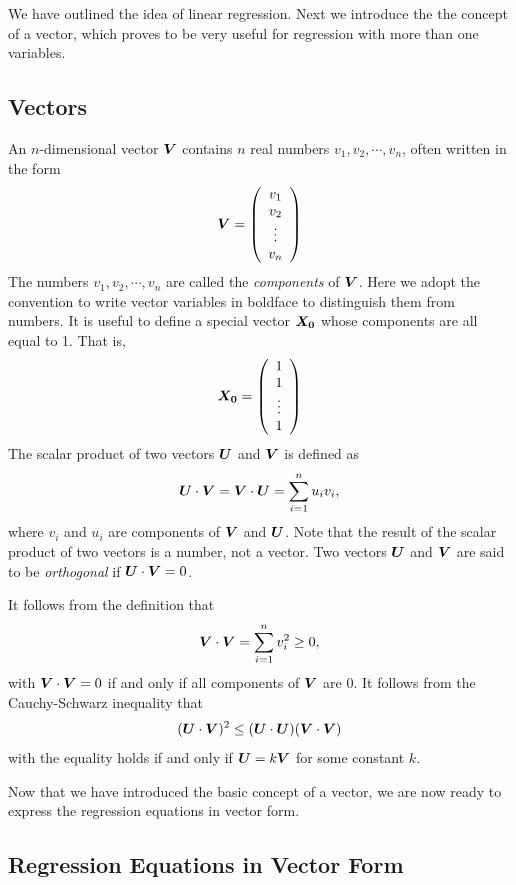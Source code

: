 \documentclass[11pt]{article}
\newcommand{\beq}{\begin{equation}}
\newcommand{\eeq}{\end{equation}}
\newcommand{\ve}[1]{\mbox{\boldmath $#1$}}
\begin{document}
We have outlined the idea of linear regression. Next we introduce the 
the concept of a vector, which proves to be very useful for regression 
with more than one variables.

\subsection{Vectors}

An $n$-dimensional vector $\ve{V}$ contains $n$ real numbers $v_1,v_2,\cdots,v_n$, often 
written in the form 
\[
  \ve{V} = \left( \begin{array}{c} v_1 \\ v_2 \\ \vdots \\ v_n \end{array} \right) 
\]
The numbers $v_1,v_2,\cdots,v_n$ are called the {\it components} of $\ve{V}$. 
Here we adopt the convention to write vector variables in boldface to distinguish 
them from numbers. It is useful to define a special vector $\ve{X_0}$ whose 
components are all equal to 1. That is, 
\beq
  \ve{X_0} = \left( \begin{array}{c} 1 \\ 1 \\ \vdots \\ 1 \end{array} \right)
\eeq
The scalar product of two vectors $\ve{U}$ and $\ve{V}$ is defined as 
\[
  \ve{U}\cdot \ve{V} = \ve{V} \cdot \ve{U} = \sum_{i=1}^n u_i v_i ,
\]
where $v_i$ and $u_i$ are components of $\ve{V}$ and $\ve{U}$. Note that the 
result of the scalar product of two vectors is a number, not a vector. 
Two vectors $\ve{U}$ and $\ve{V}$ are said to be {\it orthogonal} if  
$\ve{U}\cdot \ve{V}=0$. 

It follows from the definition that 
\[
  \ve{V} \cdot \ve{V} = \sum_{i=1}^n v_i^2 \geq 0 ,
\]
with $\ve{V}\cdot \ve{V}=0$ if and only if all components of $\ve{V}$ are 0. 
It follows from the Cauchy-Schwarz inequality that 
\[
  (\ve{U}\cdot \ve{V})^2 \leq (\ve{U}\cdot \ve{U}) (\ve{V} \cdot \ve{V}) 
\]
with the equality holds if and only if $\ve{U}=k\ve{V}$ for some constant $k$. 

Now that we have introduced the basic concept of a vector, we are now ready to 
express the regression equations in vector form.

\subsection{Regression Equations in Vector Form}
\end{document}
